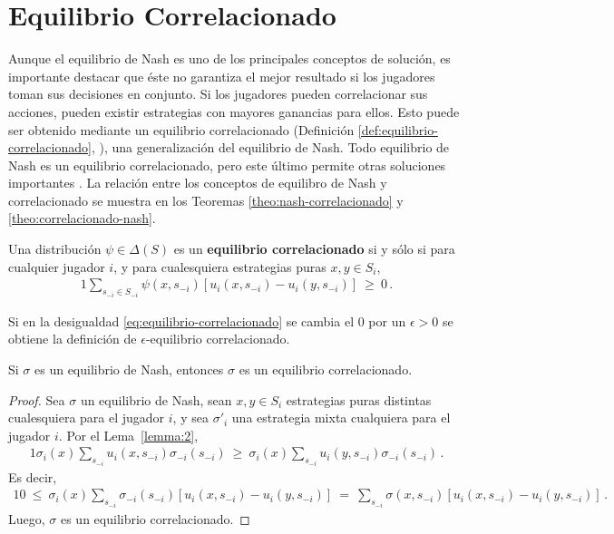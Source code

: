 \section{Equilibrio Correlacionado}

Aunque el equilibrio de Nash es uno de los principales conceptos de solución, es importante destacar que éste no garantiza el mejor resultado si los jugadores toman sus decisiones en conjunto. Si los jugadores pueden correlacionar sus acciones, pueden existir estrategias con mayores ganancias para ellos. 
Esto puede ser obtenido mediante un equilibrio correlacionado (Definición \ref{def:equilibrio-correlacionado}, \cite{bib:correlated-equilibrium}), una generalización del equilibrio de Nash. Todo equilibrio de Nash es un equilibrio correlacionado, pero este último permite otras soluciones importantes \cite{bib:correlated-equilibrium}. La relación entre los conceptos de equilibro de Nash y correlacionado se muestra en los Teoremas \ref{theo:nash-correlacionado} y \ref{theo:correlacionado-nash}.

\begin{definition}
\label{def:equilibrio-correlacionado}
Una distribución $\psi\in\Delta(S)$ es un \textbf{equilibrio correlacionado} si y sólo si para cualquier jugador $i$, y para cualesquiera estrategias puras $x, y \in S_i$,
\begin{alignat}{1}
\label{eq:equilibrio-correlacionado}
\sum_{s_{-i}\in S_{-i}} \psi(x,s_{-i}) [ u_i(x,s_{-i}) - u_i(y,s_{-i})]\ \geq\ 0 \,.
\end{alignat}
\end{definition}

Si en la desigualdad \eqref{eq:equilibrio-correlacionado} se cambia el $0$ por un $\epsilon > 0$ se obtiene la definición de $\epsilon$-equilibrio correlacionado.


\begin{theorem}
\label{theo:nash-correlacionado}
Si $\sigma$ es un equilibrio de Nash, entonces $\sigma$ es un equilibrio correlacionado.
\end{theorem}
\begin{proof}
Sea $\sigma$ un equilibrio de Nash, sean $x,y\in S_i$ estrategias puras distintas cualesquiera para el jugador $i$, y sea $\sigma'_i$ una estrategia mixta cualquiera para el jugador $i$. Por el Lema~\ref{lemma:2},
\begin{alignat}{1}
  \sigma_i(x) \sum_{s_{-i}} u_i(x,s_{-i}) \sigma_{-i}(s_{-i})\ \geq\  \sigma_i(x)\sum_{s_{-i}} u_i(y,s_{-i}) \sigma_{-i}(s_{-i}) \,.
\end{alignat}
Es decir,
\begin{alignat}{1}
  0\ \leq\ \sigma_i(x) \sum_{s_{-i}} \sigma_{-i}(s_{-i}) [u_i(x,s_{-i}) - u_i(y,s_{-i})]\ =\ \sum_{s_{-i}} \sigma(x,s_{-i}) [u_i(x,s_{-i}) - u_i(y,s_{-i})] \,.
\end{alignat}
Luego, $\sigma$ es un equilibrio correlacionado.
\end{proof}

